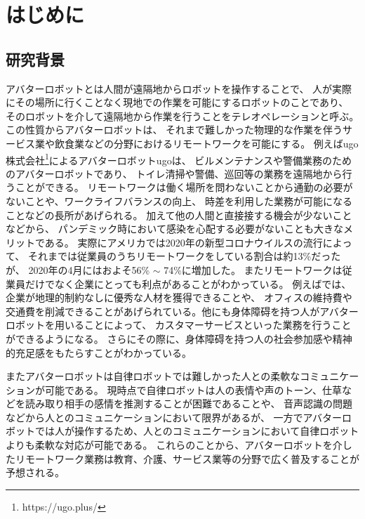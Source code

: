 \documentclass{kuisthesis}
\begin{document}
\tableofcontents



\section{はじめに} %

\subsection{研究背景} %
アバターロボットとは人間が遠隔地からロボットを操作することで、
人が実際にその場所に行くことなく現地での作業を可能にするロボットのことであり、
そのロボットを介して遠隔地から作業を行うことをテレオペレーションと呼ぶ。
この性質からアバターロボットは、
それまで難しかった物理的な作業を伴うサービス業や飲食業などの分野におけるリモートワークを可能にする。
例えばugo株式会社\footnote{https://ugo.plus/}によるアバターロボットugoは、
ビルメンテナンスや警備業務のためのアバターロボットであり、
トイレ清掃や警備、巡回等の業務を遠隔地から行うことができる。
リモートワークは働く場所を問わないことから通勤の必要がないことや、ワークライフバランスの向上、
時差を利用した業務が可能になることなどの長所があげられる。
加えて他の人間と直接接する機会が少ないことなどから、
パンデミック時において感染を心配する必要がないことも大きなメリットである。
実際にアメリカでは2020年の新型コロナウイルスの流行によって、
それまでは従業員のうちリモートワークをしている割合は約13\%だったが、
2020年の4月にはおよそ56\% $\sim$ 74\%に増加した\cite{ozimek2020future}。
またリモートワークは従業員だけでなく企業にとっても利点があることがわかっている。
例えば\cite{FERREIRA202170}では、企業が地理的制約なしに優秀な人材を獲得できることや、
オフィスの維持費や交通費を削減できることがあげられている。他にも身体障碍を持つ人がアバターロボットを用いることによって、
カスタマーサービスといった業務を行うことができるようになる。
さらにその際に、身体障碍を持つ人の社会参加感や精神的充足感をもたらすことがわかっている\cite{takeuchi2020avatar}。

またアバターロボットは自律ロボットでは難しかった人との柔軟なコミュニケーションが可能である。
現時点で自律ロボットは人の表情や声のトーン、仕草などを読み取り相手の感情を推測することが困難であることや、
音声認識の問題などから人とのコミュニケーションにおいて限界があるが、
一方でアバターロボットでは人が操作するため、人とのコミュニケーションにおいて自律ロボットよりも柔軟な対応が可能である。
これらのことから、アバターロボットを介したリモートワーク業務は教育、介護、サービス業等の分野で広く普及することが予想される。
\end{document}
